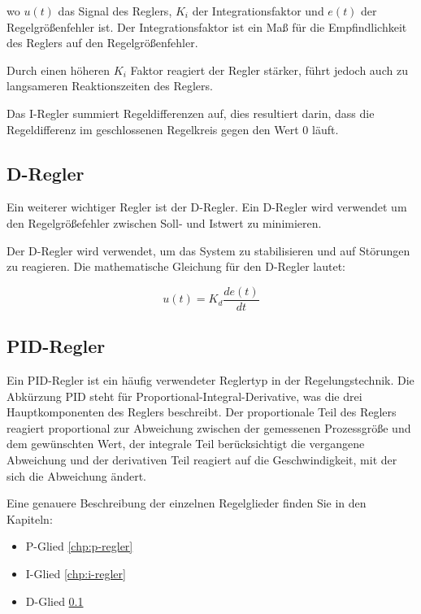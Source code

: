     wo $u(t)$ das Signal des Reglers, $K_i$ der Integrationsfaktor und $e(t)$ der Regelgrößenfehler ist. Der Integrationsfaktor ist ein Maß für die Empfindlichkeit des Reglers auf den Regelgrößenfehler.

Durch einen höheren $K_i$ Faktor reagiert der Regler stärker, führt jedoch auch zu langsameren Reaktionszeiten des Reglers.

    Das \ac{I-Regler} summiert Regeldifferenzen auf, dies resultiert darin, dass die Regeldifferenz im geschlossenen Regelkreis gegen den Wert 0 läuft.



    \subsection{D-Regler}
    \label{chp:d-regler}
    
    Ein weiterer wichtiger Regler ist der \ac{D-Regler}. Ein \ac{D-Regler} wird verwendet um den Regelgrößefehler zwischen Soll- und Istwert zu minimieren.

    Der \ac{D-Regler} wird verwendet, um das System zu stabilisieren und auf Störungen zu reagieren. Die mathematische Gleichung für den D-Regler lautet:

    \begin{figure}
        \begin{equation*}
            u(t) = K_d \frac{de(t)}{dt}
        \end{equation*}
    \end{figure}


    \subsection{PID-Regler} \label{pid_regler:subsection}
    Ein PID-Regler ist ein häufig verwendeter Reglertyp in der Regelungstechnik. Die Abkürzung PID steht für Proportional-Integral-Derivative, was die drei Hauptkomponenten des Reglers beschreibt. Der proportionale Teil des Reglers reagiert proportional zur Abweichung zwischen der gemessenen Prozessgröße und dem gewünschten Wert, der integrale Teil berücksichtigt die vergangene Abweichung und der derivativen Teil reagiert auf die Geschwindigkeit, mit der sich die Abweichung ändert.

    Eine genauere Beschreibung der einzelnen Regelglieder finden Sie in den Kapiteln: 
    \begin{itemize}
        \item{P-Glied \ref{chp:p-regler}}
        \item{I-Glied \ref{chp:i-regler}}
        \item{D-Glied \ref{chp:d-regler}}
    \end{itemize}


